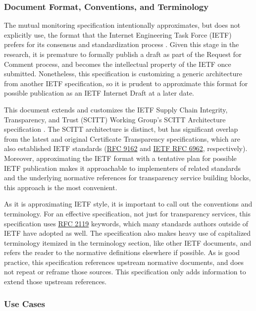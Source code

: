 \documentclass{jdf}
\begin{document}
\subsubsection{Document Format, Conventions, and Terminology}

The mutual monitoring specification intentionally approximates, but does not explicitly use, the format that the Internet Engineering Task Force (IETF) prefers for its consensus and standardization process \citeyear{ietf_authors_format}. Given this stage in the research, it is premature to formally publish a draft as part of the Request for Comment process, and becomes the intellectual property of the IETF once submitted. Nonetheless, this specification is customizing a generic architecture from another IETF specification, so it is prudent to approximate this format for possible publication as an IETF Internet Draft at a later date. 

This document extends and customizes the IETF Supply Chain Integrity, Transparency, and Trust (SCITT) Working Group's SCITT Architecture specification \citeyear{scitt25}. The SCITT architecture is distinct, but has significant overlap from the latest and original Certificate Transparency specifications, which are also established IETF standards (\href{https://datatracker.ietf.org/doc/html/rfc9162}{RFC 9162} and \href{https://datatracker.ietf.org/doc/html/rfc6962}{IETF RFC 6962}, respectively). Moreover, approximating the IETF format with a tentative plan for possible IETF publication makes it approachable to implementers of related standards and the underlying normative references for transparency service building blocks, this approach is the most convenient.

As it is approximating IETF style, it is important to call out the conventions and terminology. For an effective specification, not just for transparency services, this specification uses \href{https://datatracker.ietf.org/doc/html/rfc2119}{RFC 2119} keywords, which many standards authors outside of IETF have adopted as well. The specification also makes heavy use of capitalized terminology itemized in the terminology section, like other IETF documents, and refers the reader to the normative definitions elsewhere if possible. As is good practice, this specification references upstream normative documents, and does not repeat or reframe those sources. This specification only adds information to extend those upstream references.

\subsubsection{Use Cases}
\end{document}
